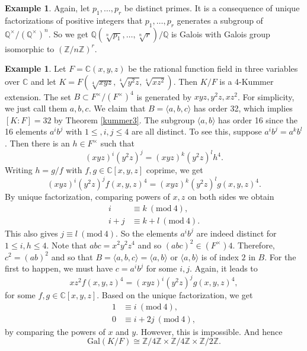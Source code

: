 \documentclass[12pt]{report}
\theoremstyle{definition}
\newtheorem{example}[theorem]{Example}
\newcommand{\Mod}[1]{\ (\mathrm{mod}\ #1)}
\newcommand{\gal}{\text{Gal}}
\newcommand{\cc}{\mathbb{C}}
\newcommand{\zz}{\mathbb{Z}}
\newcommand{\ta}[1]{\langle #1 \rangle}
\newcommand{\qq}{\mathbb{Q}}
\begin{document}
\begin{example}
	Again, let $p_1,\dots,p_r$ be distinct primes. It is a consequence of unique factorizations of positive integers that $p_1,\dots,p_r$ generates a subgroup of $\qq^\times/(\qq^\times)^n$. So we get $\qq(\sqrt[n]{p_1},\dots,\sqrt[n]{r})/\qq$ is Galois with Galois group isomorphic to $(\zz/n\zz)^r$.
\end{example}

\begin{example}
	Let $F=\cc(x,y,z)$ be the rational function field in three variables over $\cc$ and let $K=F(\sqrt[4]{xyz},\sqrt[4]{y^2z},\sqrt[4]{xz^2})$. Then $K/F$ is a 4-Kummer extension. The set $B\subset F^\times/(F^\times)^4$ is generated by $xyz,y^2z,xz^2$. For simplicity, we just call them $a,b,c$. We claim that $B=\ta{a,b,c}$ has order 32, which implies $[K:F]=32$ by Theorem \ref{kummer3}. The subgroup $\ta{a,b}$ has order 16 since the 16 elements $a^ib^j$ with $1\leq,i,j\leq 4$ are all distinct. To see this, suppose $a^ib^j=a^kb^l$. Then there is an $h\in F^\times$ such that
	$$(xyz)^i(y^2z)^j=(xyz)^k(y^2z)^lh^4.$$
	Writing $h=g/f$ with $f,g\in \cc[x,y,z]$ coprime, we get
	$$(xyz)^i(y^2z)^jf(x,y,z)^4=(xyz)^k(y^2z)^lg(x,y,z)^4.$$
	By unique factorization, comparing powers of $x,z$ on both sides we obtain \begin{align*}
		i   & \equiv k\Mod{4},   \\
		i+j & \equiv k+l\Mod{4}.
	\end{align*}
	This also gives $j\equiv l\Mod{4}$. So the elements $a^ib^j$ are indeed distinct for $1\leq i,h\leq 4$. Note that $abc=x^2y^2z^4$ and so $(abc)^2\in (F^\times)4$. Therefore, $c^2=(ab)^2$ and so that $B=\ta{a,b,c}=\ta{a,b}$ or $\ta{a,b}$ is of index $2$ in $B$. For the first to happen, we must have $c=a^ib^j$ for some $i,j$. Again, it leads to $$xz^2f(x,y,z)^4=(xyz)^i(y^2z)^jg(x,y,z)^4,$$ for some $f,g\in \cc[x,y,z]$. Based on the unique factorization, we get \begin{align*}
		1 & \equiv i\Mod{4},    \\
		0 & \equiv i+2j\Mod{4},
	\end{align*}
	by comparing the powers of $x$ and $y$. However, this is impossible. And hence $$\gal(K/F)\cong \zz/4\zz\times\zz/4\zz\times\zz/2\zz.$$
\end{example}
\end{document}

